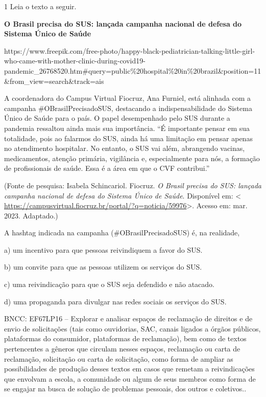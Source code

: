 
\num{1} Leia o texto a seguir.

\textbf{O Brasil precisa do SUS: lançada campanha nacional de defesa do
Sistema Único de Saúde}

https://www.freepik.com/free-photo/happy-black-pediatrician-talking-little-girl-who-came-with-mother-clinic-during-covid19-pandemic\_26768520.htm\#query=public\%20hospital\%20in\%20brazil\&position=11\&from\_view=search\&track=ais

A coordenadora do Campus Virtual Fiocruz, Ana Furniel, está alinhada com
a campanha \#OBrasilPrecisadoSUS, destacando a indispensabilidade do
Sistema Único de Saúde para o país. O papel desempenhado pelo SUS
durante a pandemia ressaltou ainda mais sua importância. ``É importante
pensar em sua totalidade, pois ao falarmos do SUS, ainda há uma
limitação em pensar apenas no atendimento hospitalar. No entanto, o SUS
vai além, abrangendo vacinas, medicamentos, atenção primária, vigilância
e, especialmente para nós, a formação de profissionais de saúde. Essa é
a área em que o CVF contribui.''

(Fonte de pesquisa: Isabela Schincariol. Fiocruz. \emph{O Brasil precisa
do SUS: lançada campanha nacional de defesa do Sistema Único de Saúde}.
Disponível em: \textless{}
\url{https://campusvirtual.fiocruz.br/portal/?q=noticia/59976}\textgreater.
Acesso em: mar. 2023. Adaptado.)

A hashtag indicada na campanha (\#OBrasilPrecisadoSUS) é, na realidade,

a) um incentivo para que pessoas reivindiquem a favor do SUS.

b) um convite para que as pessoas utilizem os serviços do SUS.

c) uma reivindicação para que o SUS seja defendido e não atacado.

d) uma propaganda para divulgar nas redes sociais os serviços do SUS.

BNCC: EF67LP16 -- Explorar e analisar espaços de reclamação de direitos
e de envio de solicitações (tais como ouvidorias, SAC, canais ligados a
órgãos públicos, plataformas do consumidor, plataformas de reclamação),
bem como de textos pertencentes a gêneros que circulam nesses espaços,
reclamação ou carta de reclamação, solicitação ou carta de solicitação,
como forma de ampliar as possibilidades de produção desses textos em
casos que remetam a reivindicações que envolvam a escola, a comunidade
ou algum de seus membros como forma de se engajar na busca de solução de
problemas pessoais, dos outros e coletivos..


